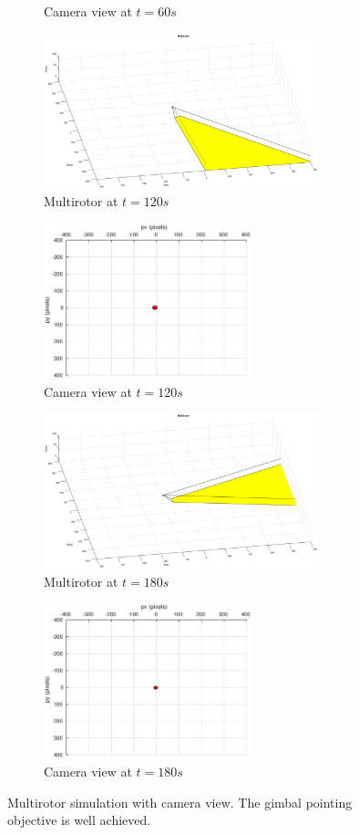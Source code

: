 \begin{figure}[htbp]
\begin{subfigure}{0.5\textwidth}
		\caption{Camera view at $t=60s$}
	\end{subfigure}	
	\begin{subfigure}{0.5\textwidth}
		\centering
		\includegraphics[height=4.5cm]{images/chapter2/uav_adaptive_120s}
		\caption{Multirotor at $t=120s$}
	\end{subfigure}%
	\begin{subfigure}{0.5\textwidth}
		\centering
		\includegraphics[height=4.5cm]{images/chapter2/camera_adaptive_120s}
		\caption{Camera view at $t=120s$}
	\end{subfigure}
	\begin{subfigure}{0.5\textwidth}
		\centering
		\includegraphics[height=4.5cm]{images/chapter2/uav_adaptive_180s}
		\caption{Multirotor at $t=180s$}
	\end{subfigure}%
	\begin{subfigure}{0.5\textwidth}
		\centering
		\includegraphics[height=4.5cm]{images/chapter2/camera_adaptive_180s}
		\caption{Camera view at $t=180s$}
	\end{subfigure}					
	\caption{Multirotor simulation with camera view. The gimbal pointing objective is well achieved.}
	\label{uav_adaptive}
\end{figure}

